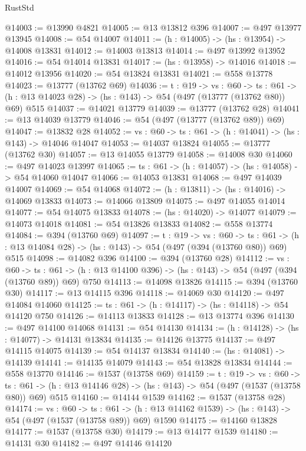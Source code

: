 \begin{lexlean}{RustStd}
\begin{coremodule}
@14003 := @13990 @4821
@14005 := @13 @13812 @396
@14007 := @497 @13977 @13945
@14008 := @54 @14007
@14011 := (h : @14005) -> (hs : @13954) -> @14008 @13831
@14012 := @14003 @13813
@14014 := @497 @13992 @13952
@14016 := @54 @14014 @13831
@14017 := (hs : @13958) -> @14016
@14018 := @14012 @13956
@14020 := @54 @13824 @13831
@14021 := @558 @13778
@14023 := @13777 (@13762 @69)
@14036 := {t : @19} ->
  {vs : @60} ->
  {ts : @61} -> (h : @13 @14023 @28) -> (hs : @143) -> @54 (@497 (@13777 (@13762 @80)) @69) @515
@14037 := @14021 @13779
@14039 := @13777 (@13762 @28)
@14041 := @13 @14039 @13779
@14046 := @54 (@497 (@13777 (@13762 @89)) @69)
@14047 := @13832 @28
@14052 := {vs : @60} -> {ts : @61} -> (h : @14041) -> (hs : @143) -> @14046 @14047
@14053 := @14037 @13824
@14055 := @13777 (@13762 @30)
@14057 := @13 @14055 @13779
@14058 := @14008 @30
@14060 := @497 @14023 @13997
@14065 := {ts : @61} -> (h : @14057) -> (hs : @14058) -> @54 @14060 @14047
@14066 := @14053 @13831
@14068 := @497 @14039 @14007
@14069 := @54 @14068
@14072 := (h : @13811) -> (hs : @14016) -> @14069 @13833
@14073 := @14066 @13809
@14075 := @497 @14055 @14014
@14077 := @54 @14075 @13833
@14078 := (hs : @14020) -> @14077
@14079 := @14073 @14018
@14081 := @54 @13826 @13833
@14082 := @558 @13774
@14084 := @394 (@13760 @69)
@14097 := {t : @19} ->
  {vs : @60} ->
  {ts : @61} -> (h : @13 @14084 @28) -> (hs : @143) -> @54 (@497 (@394 (@13760 @80)) @69) @515
@14098 := @14082 @396
@14100 := @394 (@13760 @28)
@14112 := {vs : @60} ->
  {ts : @61} -> (h : @13 @14100 @396) -> (hs : @143) -> @54 (@497 (@394 (@13760 @89)) @69) @750
@14113 := @14098 @13826
@14115 := @394 (@13760 @30)
@14117 := @13 @14115 @396
@14118 := @14069 @30
@14120 := @497 @14084 @14060
@14125 := {ts : @61} -> (h : @14117) -> (hs : @14118) -> @54 @14120 @750
@14126 := @14113 @13833
@14128 := @13 @13774 @396
@14130 := @497 @14100 @14068
@14131 := @54 @14130
@14134 := (h : @14128) -> (hs : @14077) -> @14131 @13834
@14135 := @14126 @13775
@14137 := @497 @14115 @14075
@14139 := @54 @14137 @13834
@14140 := (hs : @14081) -> @14139
@14141 := @14135 @14079
@14143 := @54 @13828 @13834
@14144 := @558 @13770
@14146 := @1537 (@13758 @69)
@14159 := {t : @19} ->
  {vs : @60} ->
  {ts : @61} -> (h : @13 @14146 @28) -> (hs : @143) -> @54 (@497 (@1537 (@13758 @80)) @69) @515
@14160 := @14144 @1539
@14162 := @1537 (@13758 @28)
@14174 := {vs : @60} ->
  {ts : @61} -> (h : @13 @14162 @1539) -> (hs : @143) -> @54 (@497 (@1537 (@13758 @89)) @69) @1590
@14175 := @14160 @13828
@14177 := @1537 (@13758 @30)
@14179 := @13 @14177 @1539
@14180 := @14131 @30
@14182 := @497 @14146 @14120

\end{coremodule}
\end{lexlean}
